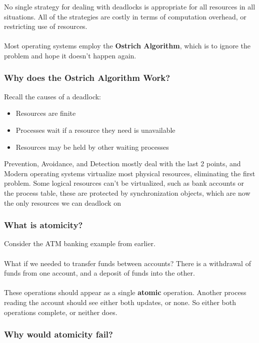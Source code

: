 \documentclass{article}
\begin{document}
No single strategy for dealing with deadlocks is appropriate for all resources in all situations. All of the strategies are costly in terms of computation overhead, or restricting use of resources.\\
\\
Most operating systems employ the \textbf{Ostrich Algorithm}, which is to ignore the problem and hope it doesn't happen again.

\subsubsection{Why does the Ostrich Algorithm Work?}

Recall the causes of a deadlock:
\begin{itemize}
    \item Resources are finite
    \item Processes wait if a resource they need is unavailable
    \item Resources may be held by other waiting processes
\end{itemize}

Prevention, Avoidance, and Detection mostly deal with the last 2 points, and Modern operating systems virtualize most physical resources, eliminating the first problem. Some logical resources can't be virtualized, such as bank accounts or the process table, these are protected by synchronization objects, which are now the only resources we can deadlock on

\subsubsection{What is atomicity?}

Consider the ATM banking example from earlier.
\\
\\
What if we needed to transfer funds between accounts? There is a withdrawal of funds from one account, and a deposit of funds into the other.
\\
\\
These operations should appear as a single \textbf{atomic} operation. Another process reading the account should see either both updates, or none. So either both operations complete, or neither does.

\subsubsection{Why would atomicity fail?}
\end{document}
